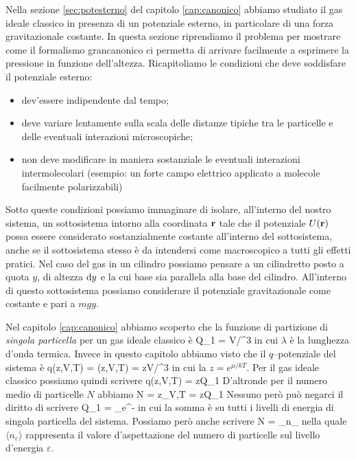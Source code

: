 Nella sezione \ref{sec:potesterno} del capitolo \ref{cap:canonico} abbiamo studiato il gas ideale classico in presenza di un potenziale esterno, in particolare di una forza gravitazionale costante. In questa sezione riprendiamo il problema per mostrare come il formalismo grancanonico ci permetta di arrivare facilmente a esprimere la pressione in funzione dell'altezza. Ricapitoliamo le condizioni che deve soddisfare il potenziale esterno:
\begin{itemize}
\item dev'essere indipendente dal tempo;
\item deve variare lentamente sulla scala delle distanze tipiche tra le particelle e delle eventuali interazioni microscopiche;
\item non deve modificare in maniera sostanziale le eventuali interazioni intermolecolari (esempio: un forte campo elettrico applicato a molecole facilmente polarizzabili)
\end{itemize}
Sotto queste condizioni possiamo immaginare di isolare, all'interno del nostro sistema, un sottosistema intorno alla coordinata $\mathbf{r}$ tale che il potenziale $U(\mathbf{r})$ possa essere considerato sostanzialmente costante all'interno del sottosistema, anche se il sottosistema stesso è da intendersi come macroscopico a tutti gli effetti pratici. Nel caso del gas in un cilindro possiamo pensare a un cilindretto posto a quota $y$, di altezza ${\textrm d}y$ e la cui base sia parallela alla base del cilindro. All'interno di questo sottosistema possiamo considerare il potenziale gravitazionale come costante e pari a $mgy$.

Nel capitolo \ref{cap:canonico} abbiamo scoperto che la funzione di partizione di {\em singola particella} per un gas ideale classico è
\be
Q_1 = V/\lambda^3
\ee
in cui $\lambda$ è la lunghezza d'onda termica. Invece in questo capitolo abbiamo visto che il $q$--potenziale del sistema è
\be
q(z,V,T) = \ln\calQ(z,V,T) = zV/\lambda^3
\ee
in cui la $z = e^{\mu/kT}$. Per il gas ideale classico possiamo quindi scrivere
\be
q(z,V,T) = zQ_1
\ee 
D'altronde per il numero medio di particelle $N$ abbiamo
\be
\label{eq:conGC0}
N = z_{V,T} = zQ_1
\ee
Nessuno però può negarci il diritto di scrivere
\be
\label{eq:conGC1}
Q_1 = \sum_\varepsilon e^{-\beta\varepsilon}
\ee
in cui la somma è su tutti i livelli di energia di singola particella del sistema. Possiamo però anche scrivere
\be
\label{eq:conGC2}
N = \sum_\varepsilon \langle n_\varepsilon\rangle
\ee
nella quale $\langle n_\varepsilon\rangle$ rappresenta il valore d'aspettazione del numero di particelle sul livello d'energia $\varepsilon$.

